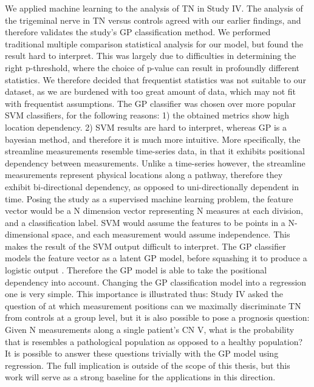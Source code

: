 We applied machine learning to the analysis of TN in Study IV. The analysis of the trigeminal nerve in TN versus controls agreed with our earlier findings, and therefore validates the study's GP classification method. We performed traditional multiple comparison statistical analysis for our model, but found the result hard to interpret. This was largely due to difficulties in determining the right p-threshold, where the choice of p-value can result in profoundly different statistics. We therefore decided that frequentist statistics was not suitable to our dataset, as we are burdened with too great amount of data, which may not fit with frequentist assumptions. 
The GP classifier was chosen over more popular SVM classifiers, for the following reasons: 1) the obtained metrics show high location dependency. 2) SVM results are hard to interpret, whereas GP is a bayesian method, and therefore it is much more intuitive. More specifically, the streamline measurements resemble time-series data, in that it exhibits positional dependency between measurements. Unlike a time-series however, the streamline measurements represent physical locations along a pathway, therefore they exhibit bi-directional dependency, as opposed to uni-directionally dependent in time. Posing the study as a supervised machine learning problem, the feature vector would be a N dimension vector representing N measures at each division, and a classification label. SVM would assume the features to be points in a N-dimensional space, and each measurement would assume independence. This makes the result of the SVM output difficult to interpret. The GP classifier models the feature vector as a latent GP model, before squashing it to produce a logistic output \cite{rasmussen2006gaussian}. Therefore the GP model is able to take the positional dependency into account. 
Changing the GP classification model into a regression one is very simple. This importance is illustrated thus: Study IV asked the question of at which measurement positions can we maximally discriminate TN from controls at a group level, but it is also possible to pose a prognosis question: Given N measurements along a single patient's CN V, what is the probability that is resembles a pathological population as opposed to a healthy population? It is possible to answer these questions trivially with the GP model using regression. The full implication is outside of the scope of this thesis, but this work will serve as a strong baseline for the applications in this direction. 




